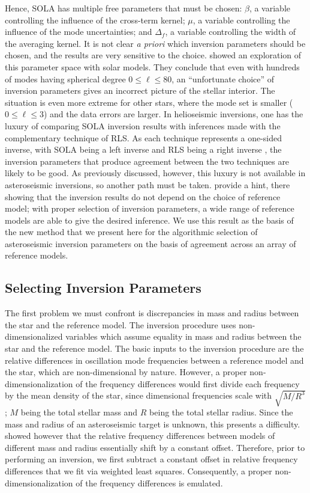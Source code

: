 \documentclass[twocolumn,twocolappendix]{aastex6}
\begin{document}
Hence, SOLA has multiple free parameters that must be chosen: $\beta$, a variable controlling the influence of the cross-term kernel; $\mu$, a variable controlling the influence of the mode uncertainties; and $\Delta_f$, a variable controlling the width of the averaging kernel. It is not clear \emph{a priori} which inversion parameters should be chosen, and the results are very sensitive to the choice. \citet{1998ESASP.418..505R} showed an exploration of this parameter space with solar models. They conclude that even with hundreds of modes having spherical degree $0\leq \ell \leq 80$, an ``unfortunate choice'' of inversion parameters gives an incorrect picture of the stellar interior. 
The situation is even more extreme for other stars, where the mode set is smaller ($0 \leq \ell \leq 3$) and the data errors are larger. 
In helioseismic inversions, one has the luxury of comparing SOLA inversion results with inferences made with the complementary technique of RLS. 
As each technique represents a one-sided inverse, with SOLA being a left inverse and RLS being a right inverse \citep[][Section 3.3]{Sekii1997}, the inversion parameters that produce agreement between the two techniques are likely to be good. 
As previously discussed, however, this luxury is not available in asteroseismic inversions, so another path must be taken. 
\citet{Basu2000} provide a hint, there showing that the inversion results do not depend on the choice of reference model; with proper selection of inversion parameters, a wide range of reference models are able to give the desired inference. 
We use this result as the basis of the new method that we present here for the algorithmic selection of asteroseismic inversion parameters on the basis of agreement across an array of reference models. 


\subsection{Selecting Inversion Parameters}

The first problem we must confront is discrepancies in mass and radius between the star and the reference model. The inversion procedure uses non-dimensionalized variables which assume equality in mass and radius between the star and the reference model. 
The basic inputs to the inversion procedure are the relative differences in oscillation mode frequencies between a reference model and the star, which are non-dimensional by nature.  
However, a proper non-dimensionalization of the frequency differences would first divide each frequency by the mean density of the star, since dimensional frequencies scale with $\sqrt{M/R^3}$; $M$ being the total stellar mass and $R$ being the total stellar radius. 
Since the mass and radius of an asteroseismic target is unknown, this presents a difficulty. 
\citet{Basu2003a} showed however that the relative frequency differences between models of different mass and radius essentially shift by a constant offset. 
Therefore, prior to performing an inversion, we first subtract a constant offset in relative frequency differences that we fit via weighted least squares. 
Consequently, a proper non-dimensionalization of the frequency differences is emulated. 
\end{document}

